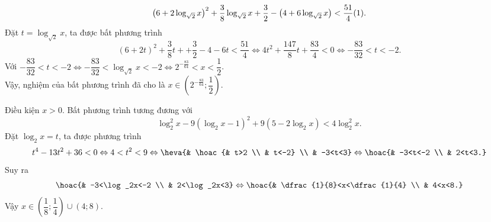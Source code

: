 \begin{bt}[1K6KK-A]
{\begin{listEX}
			$$\left(6+2\log_{\sqrt{2}}x\right)^2+\dfrac{3}{8}\log_{\sqrt{2}}x+\dfrac{3}{2}-\left(4+6\log_{\sqrt{2}}x\right)<\dfrac{51}{4}\hfill(1).$$
			Đặt $t=\log_{\sqrt{2}}x$, ta được bất phương trình
			$$(6+2t)^2+\dfrac{3}{8}t++\dfrac{3}{2}-4-6t<\dfrac{51}{4}\Leftrightarrow 4t^2+\dfrac{147}{8}t+\dfrac{83}{4}<0\Leftrightarrow -\dfrac{83}{32}<t<-2.$$
			Với $-\dfrac{83}{32}<t<-2\Leftrightarrow -\dfrac{83}{32}<\log_{\sqrt{2}}x<-2\Leftrightarrow 2^{-\tfrac{83}{64}}<x<\dfrac{1}{2}$.\\
			Vậy, nghiệm của bất phương trình đã cho là $x\in\left(2^{-\tfrac{83}{64}};\dfrac{1}{2}\right)$.
			\item Điều kiện $x>0$. Bất phương trình tương đương với
			$$\log_2^2x-9(\log_2x-1)^2+9(5-2\log_2x)<4\log_2^2x.$$
			Đặt $\log_2x=t$, ta được phương trình
			$$t^4-13t^2+36<0\Leftrightarrow 4<t^2<9\Leftrightarrow\heva{& \hoac{& t>2 \\ & t<-2} \\ & -3<t<3}\Leftrightarrow \hoac{& -3<t<-2 \\ & 2<t<3.}$$
			Suy ra 
			$$\hoac{& -3<\log_2x<-2 \\ & 2<\log_2x<3}\Leftrightarrow\hoac{& \dfrac{1}{8}<x<\dfrac{1}{4} \\ & 4<x<8.}$$
			Vậy $x\in\left(\dfrac{1}{8};\dfrac{1}{4}\right)\cup(4;8)$.
		\end{listEX}
	}
\end{bt}




